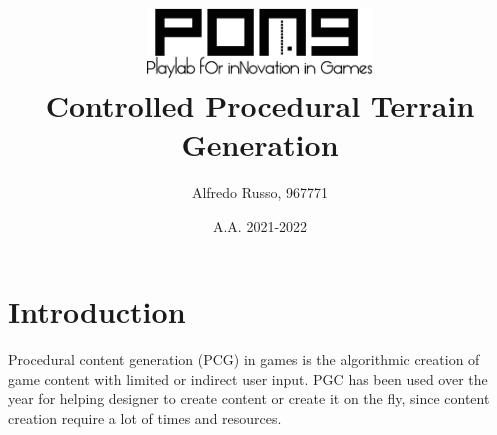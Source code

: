 \documentclass[12pt]{article}
\begin{document}
    \title{\includegraphics[width=6cm]{images/Pong}\\[2cm]Controlled Procedural Terrain Generation}
    \author{Alfredo Russo, 967771}
    \date{A.A. 2021-2022}
    
    \maketitle
    \newpage
    
    \tableofcontents
    \newpage
    

    \section{Introduction}



    Procedural content generation (PCG) in games is the algorithmic creation of game content with limited or indirect user input. PGC has been used over the year 
    for helping designer to create content or create it on the fly, since content creation require a lot of times and resources.
\end{document}
